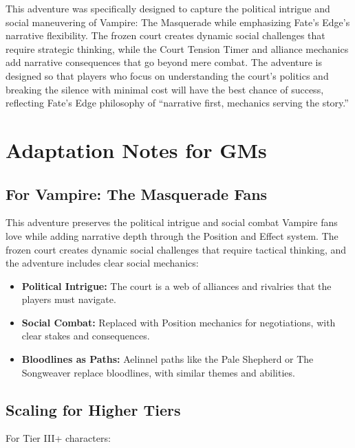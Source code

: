 \documentclass{article}
\begin{document}
\begin{tcolorbox}[colback=blue!5,colframe=blue!50!black,title=Design Note,breakable]
This adventure was specifically designed to capture the political intrigue and social maneuvering of Vampire: The Masquerade while emphasizing Fate's Edge's narrative flexibility. The frozen court creates dynamic social challenges that require strategic thinking, while the Court Tension Timer and alliance mechanics add narrative consequences that go beyond mere combat. The adventure is designed so that players who focus on understanding the court's politics and breaking the silence with minimal cost will have the best chance of success, reflecting Fate's Edge philosophy of ``narrative first, mechanics serving the story.''
\end{tcolorbox}

\section{Adaptation Notes for GMs}

\subsection{For Vampire: The Masquerade Fans}

This adventure preserves the political intrigue and social combat Vampire fans love while adding narrative depth through the Position and Effect system. The frozen court creates dynamic social challenges that require tactical thinking, and the adventure includes clear social mechanics:

\begin{itemize}
    \item \textbf{Political Intrigue:} The court is a web of alliances and rivalries that the players must navigate.
    \item \textbf{Social Combat:} Replaced with Position mechanics for negotiations, with clear stakes and consequences.
    \item \textbf{Bloodlines as Paths:} Aelinnel paths like the Pale Shepherd or The Songweaver replace bloodlines, with similar themes and abilities.
\end{itemize}

\subsection{Scaling for Higher Tiers}

For Tier III+ characters:
\end{document}
